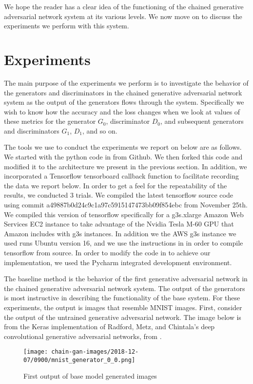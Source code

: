 \documentclass[conference]{IEEEtran}
\begin{document}
We hope the reader has a clear idea of the functioning of the chained generative
adversarial network system at its various levels.  We now move on to discuss the
experiments we perform with this system.

\section{Experiments}

The main purpose of the experiments we perform is to investigate the behavior of
the generators and discriminators in the chained generative adversarial network
system as the output of the generators flows through the system.  Specifically
we wish to know how the accuracy and the loss changes when we look at values of 
these metrics for the generator $G_{0}$, discriminator $D_{0}$, and subsequent
generators and discriminators $G_{1}$, $D_{1}$, and so on.

The tools we use to conduct the experiments we report on below are as follows.
We started with the python code in \cite{kerasdcgan} from Github.  We then
forked this code and modified it to the architecture we present in the previous
section.  In addition, we incorporated a Tensorflow tensorboard callback
function to facilitate recording the data we report below.  In order to get a
feel for the repeatability of the results, we conducted 3 trials. We compiled
the latest tensorflow source code using commit
a49887b0d24c9c1a97c5915147473bb09f854ebc from November 25th.  We compiled this
version of tensorflow specifically for a g3s.xlarge Amazon Web Services EC2
instance to take advantage of the Nvidia Tesla M-60 GPU that Amazon includes
with g3s instances.  In addition we the AWS g3s instance we used runs Ubuntu
version 16, and we use the instructions in \cite{tensorflowbuild} in order to 
compile tensorflow from source.  In order to modify the code in
\cite{kerasdcgan} to achieve our implementation, we used the Pycharm integrated 
development environment.  

The baseline method is the behavior of the first generative adversarial network 
in the chained generative adversarial network system.  The output of the
generators is most instructive in describing the functionality of the base
system.  For these experiments, the output is images that resemble MNIST images.
First, consider the output of the untrained generative adversarial network. The
image below is from the Keras implementation of Radford, Metz, and Chintala's
deep convolutional generative adversarial networks, from \cite{kerasdcgan}.
\begin{figure}[htbp]
\centerline{\texttt{[image: chain-gan-images/2018-12-07/0900/mnist\_generator\_0\_0.png]}}
\caption{First output of base model generated images}
\label{initalGan}
\end{figure}
\end{document}
